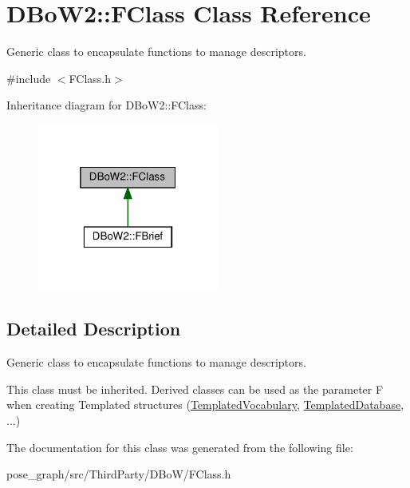 \hypertarget{classDBoW2_1_1FClass}{}\section{D\+Bo\+W2\+:\+:F\+Class Class Reference}
\label{classDBoW2_1_1FClass}


Generic class to encapsulate functions to manage descriptors.  




{\ttfamily \#include $<$F\+Class.\+h$>$}



Inheritance diagram for D\+Bo\+W2\+:\+:F\+Class\+:\nopagebreak
\begin{figure}[H]
\begin{center}
\leavevmode
\includegraphics[width=169pt]{classDBoW2_1_1FClass__inherit__graph}
\end{center}
\end{figure}


\subsection{Detailed Description}
Generic class to encapsulate functions to manage descriptors. 

This class must be inherited. Derived classes can be used as the parameter F when creating Templated structures (\hyperlink{classDBoW2_1_1TemplatedVocabulary}{Templated\+Vocabulary}, \hyperlink{classDBoW2_1_1TemplatedDatabase}{Templated\+Database}, ...) 

The documentation for this class was generated from the following file\+:\begin{DoxyCompactItemize}
\item 
pose\+\_\+graph/src/\+Third\+Party/\+D\+Bo\+W/F\+Class.\+h\end{DoxyCompactItemize}

